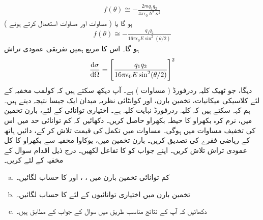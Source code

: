 \begin{align}
	f(\theta)\cong-\frac{2mq_1q_2}{4\pi\epsilon_0\hslash^2\kappa^2}
\end{align}
ہو گا  یا ( مساوات  اور مساوات   استعمال کرتے ہوئے ) 
\begin{align}
	f(\theta)\cong-\frac{q_1q_2}{16\pi\epsilon_0E\sin^2(\theta/2)}
\end{align}
ہو گا۔ اس کا مربع ہمیں تفریقی عمودی تراش 
\begin{align}
	\frac{\dif\sigma}{\dif\Omega}=\left[\frac{q_1q_2}{16\pi\epsilon_0E\sin^2(\theta/2)}\right]^2
\end{align}
دیگا، جو ٹھیک کلیہ ردرفورڈ ( مساوات )   ہے۔ آپ دیکھ سکتے ہیں کہ کولمب مخفیہ کے لئے کلاسیکی  میکانیات،  تخمین بارن،  اور کوانٹائی نظریہ میدان ایک  جیسا نتیجہ دیتے ہیں۔ ہم کہہ سکتے ہیں کہ کلیہ ردرفورڈ نہایت    کلیہ ہے۔
اختیاری توانائی کے لئے،  بارن تخمین میں،  نرم کرہ بکھراو کا حیطہ بکھراو  حاصل کریں۔  دکھائیں کہ کم توانائی حد میں اس کی تخفیف  مساوات   میں  ہوگی۔
مساوات  میں تکمل کی قیمت تلاش  کر کے،  دائیں ہاتھ کے  ریاضی فقرے   کی تصدیق کریں۔
بارن تخمین میں،  یوکاوا مخفیہ سے بکھراو کا کل عمودی تراش تلاش کریں۔ اپنے جواب کو  کا تفاعل لکھیں۔
درج ذیل اقدام سوال  کے مخفیہ کے لئے کریں۔
\begin{enumerate}[a.]
\item
 کم توانائی تخمین بارن میں ،  ،  اور  کا حساب لگائیں۔
\item
 تخمین بارن میں اختیاری توانائیوں کے لئے  کا حساب لگائیں۔
\item
دکھائیں کہ آپ کے نتائج مناسب  طریق  میں سوال  کے جواب کے مطابق ہیں۔
\end{enumerate}


